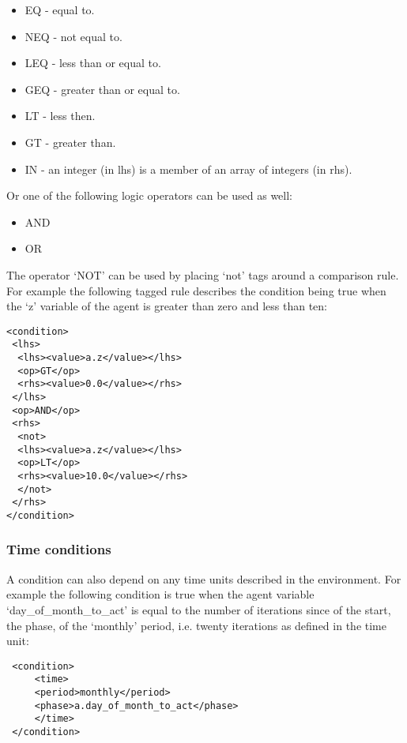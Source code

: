 \begin{itemize}
\item EQ - equal to.
\item NEQ - not equal to.
\item LEQ - less than or equal to.
\item GEQ - greater than or equal to.
\item LT - less then.
\item GT - greater than.
\item IN - an integer (in lhs) is a member of an array of integers (in rhs).
\end{itemize}

Or one of the following logic operators can be used as well:

\begin{itemize}
\item AND
\item OR
\end{itemize}

The operator `NOT' can be used by placing `not' tags around a comparison rule.
For example the following tagged rule describes the condition being true when
the `z' variable of the agent is greater than zero and less than ten:

\begin{mylisting}
\begin{verbatim}
<condition>
 <lhs>
  <lhs><value>a.z</value></lhs>
  <op>GT</op>
  <rhs><value>0.0</value></rhs>
 </lhs>
 <op>AND</op>
 <rhs>
  <not>
  <lhs><value>a.z</value></lhs>
  <op>LT</op>
  <rhs><value>10.0</value></rhs>
  </not>
 </rhs>
</condition>
\end{verbatim}
\end{mylisting}

\subsubsection{Time conditions}

A condition can also depend on any time units described in the environment. For
example the following condition is true when the agent variable
`day\_of\_month\_to\_act' is equal to the number of iterations since of the
start, the phase, of the `monthly' period, i.e. twenty iterations as defined in
the time unit:

\begin{mylisting}
\begin{verbatim}
 <condition>
     <time>
     <period>monthly</period>
     <phase>a.day_of_month_to_act</phase>
     </time>
 </condition>
\end{verbatim}
\end{mylisting}

